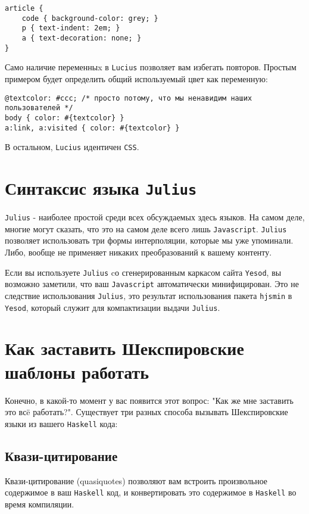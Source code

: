 \begin{lstlisting}
article {
    code { background-color: grey; }
    p { text-indent: 2em; }
    a { text-decoration: none; }
}
\end{lstlisting}

Само наличие переменныx в \texttt{Lucius} позволяет вам избегать повторов. Простым примером
будет определить общий используемый цвет как переменную:

\begin{lstlisting}
@textcolor: #ccc; /* просто потому, что мы ненавидим наших пользователей */
body { color: #{textcolor} }
a:link, a:visited { color: #{textcolor} }
\end{lstlisting}

В остальном, \texttt{Lucius} идентичен \texttt{CSS}.

\section{Синтаксис языка \texttt{Julius}}

\texttt{Julius} - наиболее простой среди всех обсуждаемых здесь языков. На самом деле,
многие могут сказать, что это на самом деле всего лишь \texttt{Javascript}. \texttt{Julius}
позволяет использовать три формы интерполяции, которые мы уже упоминали.
Либо, вообще не применяет никаких преобразований к вашему контенту.

Если вы используете \texttt{Julius} cо сгенерированным каркасом сайта \texttt{Yesod}, вы возможно заметили, что ваш
\texttt{Javascript} автоматически минифицирован. Это не следствие использования \texttt{Julius}, это
результат использования пакета \lstinline!hjsmin! в \texttt{Yesod}, который служит для компактизации
выдачи \texttt{Julius}.

\section{Как заставить Шекспировские шаблоны работать}

Конечно, в какой-то момент у вас появится этот вопрос: "Как же мне заставить это
всë работать?". Существует три разных способа вызывать Шекспировские языки
из вашего \texttt{Haskell} кода:

\subsection{Квази-цитирование}
Квази-цитирование (quasiquotes) позволяют вам встроить произвольное содержимое в ваш \texttt{Haskell} код, и
конвертировать это содержимое в \texttt{Haskell} во время компиляции.

